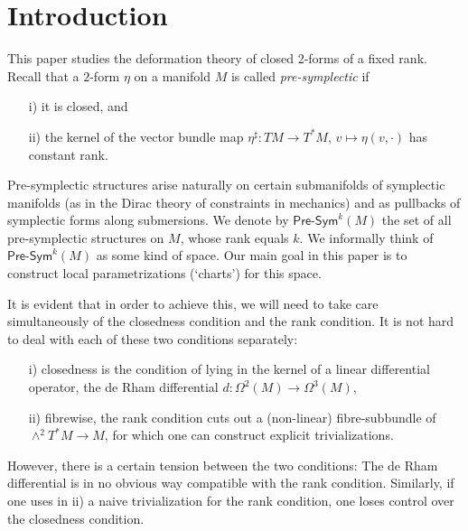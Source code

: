 \documentclass[11pt,thmsa]{amsart}
\theoremstyle{definition}
\newcommand{\Presym}{\mathsf{Pre}\textrm{-}\mathsf{Sym}}
\begin{document}
  
\tableofcontents

 
\section*{\textsf{Introduction}}


This paper studies the deformation theory of closed 2-forms of a fixed rank.
Recall that a $2$-form $\eta$ on a manifold $M$ is called {\em pre-symplectic} if
\begin{itemize}
\item[i)] it is closed, and
\item[ii)] the kernel of the vector bundle map $\eta^\sharp: TM \to T^*M,\, v\mapsto \eta(v,\cdot)$ has constant rank. 
\end{itemize}
Pre-symplectic structures arise naturally on certain submanifolds of symplectic manifolds (as in the Dirac theory of constraints in mechanics) and as pullbacks of symplectic forms along submersions.
We denote  by  $\Presym^k(M)$ the set of all pre-symplectic structures on $M$, whose rank equals $k$.
We informally think of $\Presym^k(M)$ as some kind of space. Our main goal in this paper is to construct local parametrizations (`charts') for this space.

It is evident that in order to achieve this, we will need to take care simultaneously of the closedness condition and the rank condition. It is not hard to deal with each of these two conditions separately:
\begin{itemize}
\item[i)] closedness is the condition of lying in the kernel of a linear differential operator, the de Rham differential $d:\Omega^2(M)\to \Omega^3(M)$,
\item[ii)] fibrewise, the rank condition cuts out a (non-linear) fibre-subbundle of $\wedge^2 T^*M \to M$, for which one can construct explicit trivializations.
\end{itemize}
However, there is a certain tension between the two conditions:
The de Rham differential is in no obvious way compatible with the rank condition. Similarly, if one uses in ii) a naive trivialization for the rank condition, one loses control over the closedness condition.
\\
 
\end{document}
